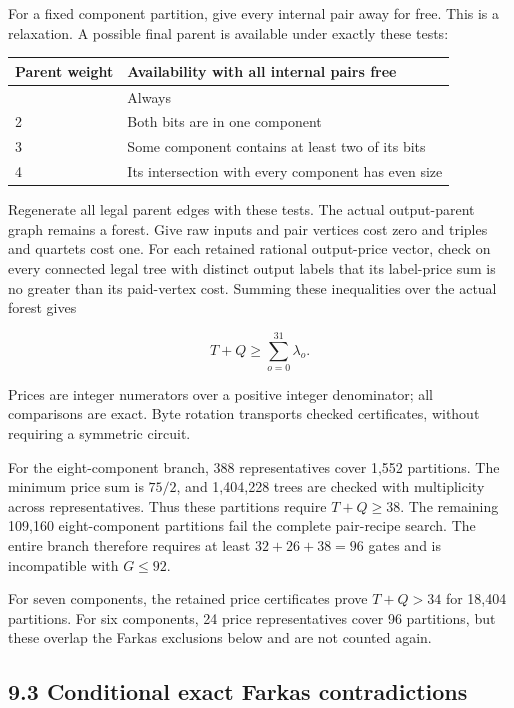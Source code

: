 For a fixed component partition, give every internal pair away for free. This is a relaxation. A possible final parent is available under exactly these tests:

\begin{longtable}[]{@{}ll@{}}
\toprule\noalign{}
Parent weight & Availability with all internal pairs free \\
\midrule\noalign{}
\endhead
\bottomrule\noalign{}
\endlastfoot
1 & Always \\
2 & Both bits are in one component \\
3 & Some component contains at least two of its bits \\
4 & Its intersection with every component has even size \\
\end{longtable}

Regenerate all legal parent edges with these tests. The actual output-parent graph remains a forest. Give raw inputs and pair vertices cost zero and triples and quartets cost one. For each retained rational output-price vector, check on every connected legal tree with distinct output labels that its label-price sum is no greater than its paid-vertex cost. Summing these inequalities over the actual forest gives

\[T+Q\geq\sum_{o=0}^{31}\lambda_o.\]

Prices are integer numerators over a positive integer denominator; all comparisons are exact. Byte rotation transports checked certificates, without requiring a symmetric circuit.

For the eight-component branch, 388 representatives cover 1,552 partitions. The minimum price sum is \(75/2\), and 1,404,228 trees are checked with multiplicity across representatives. Thus these partitions require \(T+Q\geq38\). The remaining 109,160 eight-component partitions fail the complete pair-recipe search. The entire branch therefore requires at least \(32+26+38=96\) gates and is incompatible with \(G\leq92\).

For seven components, the retained price certificates prove \(T+Q>34\) for 18,404 partitions. For six components, 24 price representatives cover 96 partitions, but these overlap the Farkas exclusions below and are not counted again.

\hypertarget{conditional-exact-farkas-contradictions}{%
\subsection{9.3 Conditional exact Farkas contradictions}\label{conditional-exact-farkas-contradictions}}

